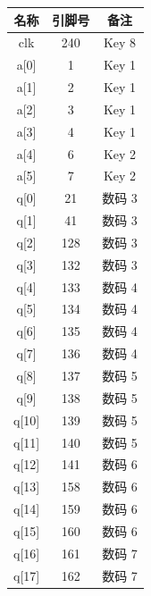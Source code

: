 \begin{enumerate}
    \begin{table}[H]
        \centering
        \begin{tabular}{|c|c|c|}
            \hline
            名称 & 引脚号 & 备注 \\
            \hline
            clk & 240 & Key 8 \\
            \hline
            a[0] & 1 & Key 1 \\
            \hline
            a[1] & 2 & Key 1 \\
            \hline
            a[2] & 3 & Key 1 \\
            \hline
            a[3] & 4 & Key 1 \\
            \hline
            a[4] & 6 & Key 2 \\
            \hline
            a[5] & 7 & Key 2 \\
            \hline
            q[0] & 21 & 数码 3 \\
            \hline
            q[1] & 41 & 数码 3 \\
            \hline
            q[2] & 128 & 数码 3 \\
            \hline
            q[3] & 132 & 数码 3 \\
            \hline
            q[4] & 133 & 数码 4 \\
            \hline
            q[5] & 134 & 数码 4 \\
            \hline
            q[6] & 135 & 数码 4 \\
            \hline
            q[7] & 136 & 数码 4 \\
            \hline
            q[8] & 137 & 数码 5 \\
            \hline
            q[9] & 138 & 数码 5 \\
            \hline
            q[10] & 139 & 数码 5 \\
            \hline
            q[11] & 140 & 数码 5 \\
            \hline
            q[12] & 141 & 数码 6 \\
            \hline
            q[13] & 158 & 数码 6 \\
            \hline
            q[14] & 159 & 数码 6 \\
            \hline
            q[15] & 160 & 数码 6 \\
            \hline
            q[16] & 161 & 数码 7 \\
            \hline
            q[17] & 162 & 数码 7 \\
            \hline

\end{tabular}
\end{table}
\end{enumerate}

